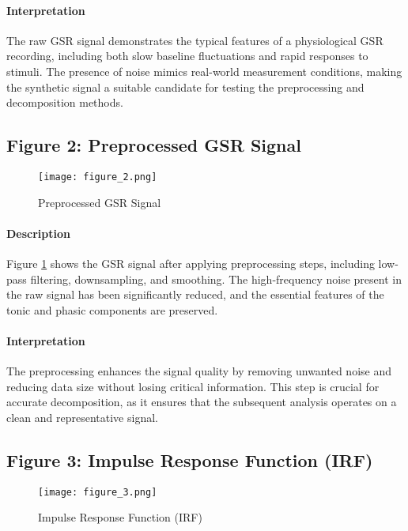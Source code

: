 \documentclass[twocolumn]{article}
\begin{document}
\paragraph{Interpretation}

The raw GSR signal demonstrates the typical features of a physiological GSR recording, including both slow baseline fluctuations and rapid responses to stimuli. The presence of noise mimics real-world measurement conditions, making the synthetic signal a suitable candidate for testing the preprocessing and decomposition methods.

\subsection*{Figure 2: Preprocessed GSR Signal}

\begin{figure}[H]
\centering
\texttt{[image: figure\_2.png]}
\caption{Preprocessed GSR Signal}
\label{fig:preprocessed_gsr_signal}
\end{figure}

\paragraph{Description}

Figure \ref{fig:preprocessed_gsr_signal} shows the GSR signal after applying preprocessing steps, including low-pass filtering, downsampling, and smoothing. The high-frequency noise present in the raw signal has been significantly reduced, and the essential features of the tonic and phasic components are preserved.

\paragraph{Interpretation}

The preprocessing enhances the signal quality by removing unwanted noise and reducing data size without losing critical information. This step is crucial for accurate decomposition, as it ensures that the subsequent analysis operates on a clean and representative signal.

\subsection*{Figure 3: Impulse Response Function (IRF)}

\begin{figure}[H]
\centering
\texttt{[image: figure\_3.png]}
\caption{Impulse Response Function (IRF)}
\label{fig:irf}
\end{figure}
\end{document}
